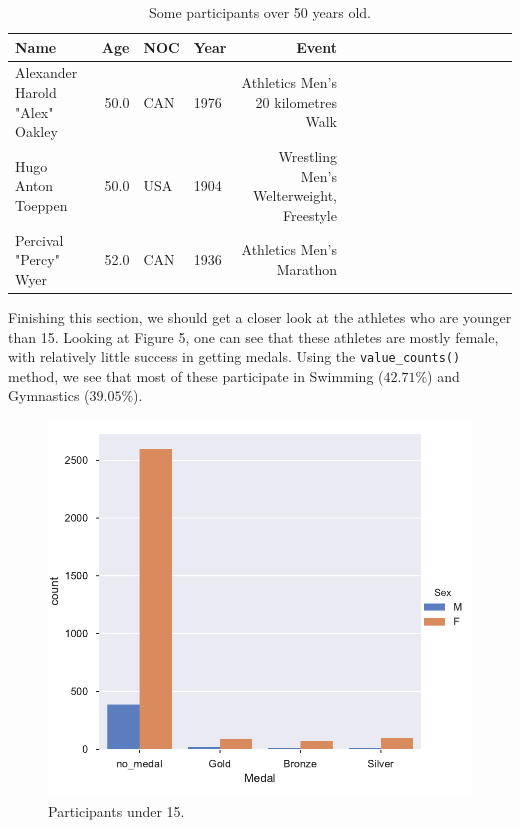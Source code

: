 \documentclass[11pt]{article} %
\begin{document}
\begin{table}
\begin{tabular}{lrllrrrllrlllllll}
\toprule                        
Name &   Age &     NOC &  Year &                                      Event  \\
\midrule
Alexander Harold "Alex" Oakley &  50.0 &    CAN &  1976 &            Athletics Men's 20 kilometres Walk  \\
Hugo Anton Toeppen &  50.0 &        USA &  1904 &     Wrestling Men's Welterweight, Freestyle  \\
Percival "Percy" Wyer &   52.0 &      CAN &  1936 &                      Athletics Men's Marathon  \\
\bottomrule
\end{tabular}
\caption{Some participants over 50 years old.}
\end{table}

Finishing this section, we should get a closer look at the athletes who are younger than 15. Looking at Figure 5, one can see that these athletes are mostly female, with relatively little success in getting medals. Using the {\tt value\_counts()} method, we see that most of these participate in Swimming ($42.71\%$) and Gymnastics ($39.05\%$).

\begin{figure}
    \centering
    \includegraphics[scale=0.8]{Countplot_under_15.pdf}
    \caption{Participants under 15.}
\end{figure}
\end{document}
